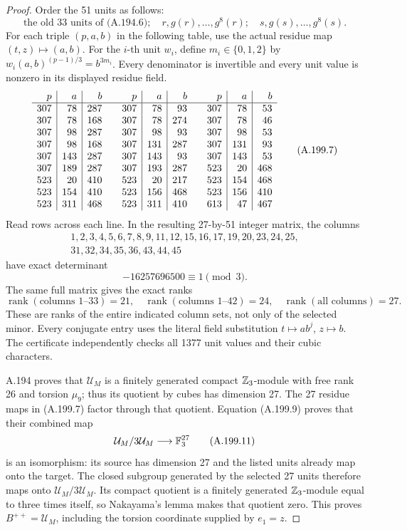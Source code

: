 \begin{proof}
Order the 51 units as follows:
\[
 \text{the old 33 units of (A.194.6)};\quad
      r,g(r),\ldots,g^8(r);\quad
      s,g(s),\ldots,g^8(s).
\tag{A.199.6}
\]
For each triple \((p,a,b)\) in the following table, use
the actual residue map \((t,z)\mapsto(a,b)\).
For the \(i\)-th unit \(w_i\), define \(m_i\in\{0,1,2\}\)
by \(w_i(a,b)^{(p-1)/3}=b^{3m_i}\).
Every denominator is invertible and every unit value is
nonzero in its displayed residue field.
\[
\begin{array}{r|r|r@{\qquad}r|r|r@{\qquad}r|r|r}
 p&a&b&p&a&b&p&a&b\\\hline
307&78&287&307&78&93&307&78&53\\
307&78&168&307&78&274&307&78&46\\
307&98&287&307&98&93&307&98&53\\
307&98&168&307&131&287&307&131&93\\
307&143&287&307&143&93&307&143&53\\
307&189&287&307&193&287&523&20&468\\
523&20&410&523&20&217&523&154&468\\
523&154&410&523&156&468&523&156&410\\
523&311&468&523&311&410&613&47&467
\end{array}
\tag{A.199.7}
\]
Read rows across each line.  In the resulting 27-by-51
integer matrix, the columns
\[
\begin{split}
 1,2,3,4,5,6,7,8,9,11,12,15,16,17,19,20,23,24,25,\\
                      31,32,34,35,36,43,44,45
\end{split}
\tag{A.199.8}
\]
have exact determinant
\[
                        -16257696500\equiv1\pmod3.
\tag{A.199.9}
\]
The same full matrix gives the exact ranks
\[
 \operatorname{rank}(\text{columns }1\text{--}33)=21,
 \quad
 \operatorname{rank}(\text{columns }1\text{--}42)=24,
 \quad
 \operatorname{rank}(\text{all columns})=27.
\tag{A.199.10}
\]
These are ranks of the entire indicated column sets, not
only of the selected minor.  Every conjugate entry uses
the literal field substitution \(t\mapsto ab^j\),
\(z\mapsto b\).  The certificate independently checks
all 1377 unit values and their cubic characters.

A.194 proves that \(\mathcal U_M\) is a finitely generated
compact \(\mathbb Z_3\)-module with free rank 26 and torsion
\(\mu_9\); thus its quotient by cubes has dimension 27.
The 27 residue maps in (A.199.7) factor through that quotient.
Equation (A.199.9) proves that their combined map
\[
 \mathcal U_M/3\mathcal U_M
         \longrightarrow\mathbb F_3^{27}
\tag{A.199.11}
\]
is an isomorphism: its source has dimension 27 and the
listed units already map onto the target.
The closed subgroup generated by the selected 27 units
therefore maps onto \(\mathcal U_M/3\mathcal U_M\).
Its compact quotient is a finitely generated \(\mathbb Z_3\)-module
equal to three times itself, so Nakayama's lemma makes that
quotient zero.  This proves \(B^{++}=\mathcal U_M\),
including the torsion coordinate supplied by \(e_1=z\).


\end{proof}
